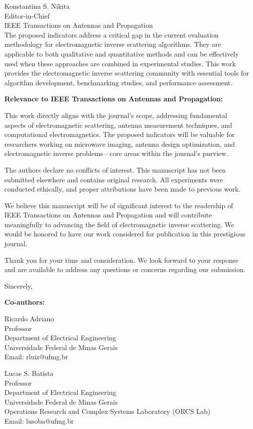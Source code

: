 \documentclass[11pt]{letter}
\begin{document}
\begin{letter}{
Konstantina S. Nikita\\
Editor-in-Chief\\
IEEE Transactions on Antennas and Propagation\\
}
The proposed indicators address a critical gap in the current evaluation methodology for electromagnetic inverse scattering algorithms. They are applicable to both qualitative and quantitative methods and can be effectively used when these approaches are combined in experimental studies. This work provides the electromagnetic inverse scattering community with essential tools for algorithm development, benchmarking studies, and performance assessment.


\textbf{Relevance to IEEE Transactions on Antennas and Propagation:}

This work directly aligns with the journal's scope, addressing fundamental aspects of electromagnetic scattering, antenna measurement techniques, and computational electromagnetics. The proposed indicators will be valuable for researchers working on microwave imaging, antenna design optimization, and electromagnetic inverse problems—core areas within the journal's purview.

The authors declare no conflicts of interest. This manuscript has not been submitted elsewhere and contains original research. All experiments were conducted ethically, and proper attributions have been made to previous work.

We believe this manuscript will be of significant interest to the readership of IEEE Transactions on Antennas and Propagation and will contribute meaningfully to advancing the field of electromagnetic inverse scattering. We would be honored to have our work considered for publication in this prestigious journal.

Thank you for your time and consideration. We look forward to your response and are available to address any questions or concerns regarding our submission.

\closing{Sincerely,}

\vspace{1cm}

\noindent
\textbf{Co-authors:}

\vspace{0.5cm}

\noindent
Ricardo Adriano\\
Professor\\
Department of Electrical Engineering\\
Universidade Federal de Minas Gerais\\
Email: rluiz@ufmg.br

\vspace{0.5cm}

\noindent
Lucas S. Batista\\
Professor\\
Department of Electrical Engineering\\
Universidade Federal de Minas Gerais\\
Operations Research and Complex Systems Laboratory (ORCS Lab)\\
Email: lusoba@ufmg.br

\end{letter}
\end{document}
